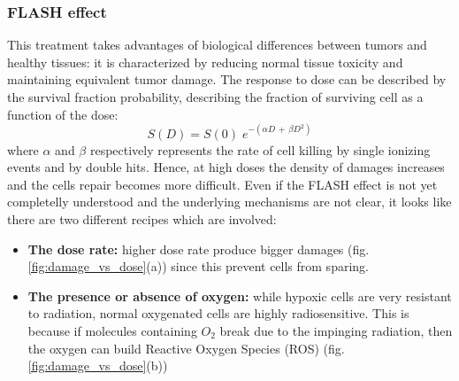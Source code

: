         \subsubsection{FLASH effect}
            This treatment takes advantages of biological differences between tumors and healthy tissues: it is characterized by reducing normal tissue toxicity and maintaining equivalent tumor damage. 
            The response to dose can be described by the survival fraction probability, describing the fraction of surviving cell as a function of the dose: 
            \begin{equation}
                S(D) = S(0)\;e^{-( \alpha D \, + \, \beta D^2)}
                \label{eq:survival_curve}
            \end{equation}
            where $\alpha$ and $\beta$ respectively represents the rate of cell killing by single ionizing events and by double hits. 
            Hence, at high doses the density of damages increases and the cells repair becomes more difficult. 
            Even if the FLASH effect is not yet completelly understood and the underlying mechanisms are not clear, it looks like there are two different recipes which are involved:
            \begin{itemize}
                \item \textbf{The dose rate:} 
                higher dose rate produce bigger damages (fig. \ref{fig:damage_vs_dose}(a)) since this prevent cells from sparing.
                \item \textbf{The presence or absence of oxygen:} 
                while hypoxic cells are very resistant to
                radiation, normal oxygenated cells are highly radiosensitive. 
                This is because if molecules containing $O_2$ break due to the impinging radiation, then the oxygen can build Reactive Oxygen Species (ROS) (fig.\ref{fig:damage_vs_dose}(b))
            \end{itemize} 
